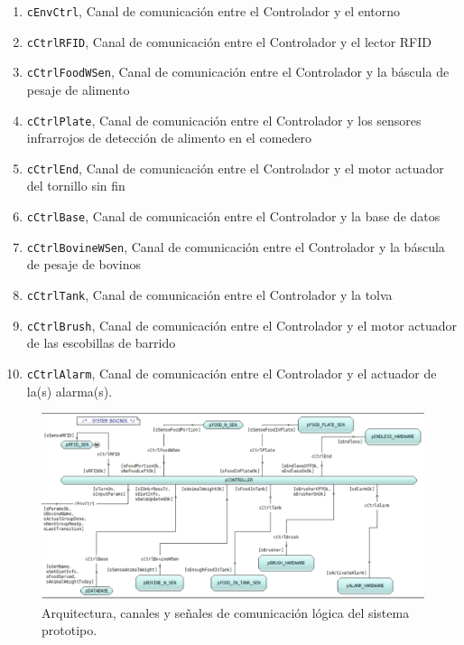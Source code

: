 \begin{enumerate}
    \item \texttt{cEnvCtrl}, Canal de comunicación entre el Controlador y el entorno
    \item \texttt{cCtrlRFID}, Canal de comunicación entre el Controlador y el lector RFID
    \item \texttt{cCtrlFoodWSen}, Canal de comunicación entre el Controlador y la báscula de pesaje de alimento
    \item \texttt{cCtrlPlate}, Canal de comunicación entre el Controlador y los sensores infrarrojos de detección de alimento en el comedero
    \item \texttt{cCtrlEnd}, Canal de comunicación entre el Controlador y el motor actuador del tornillo sin fin
    \item \texttt{cCtrlBase}, Canal de comunicación entre el Controlador y la base de datos
    \item \texttt{cCtrlBovineWSen}, Canal de comunicación entre el Controlador y la báscula de pesaje de bovinos
    \item \texttt{cCtrlTank}, Canal de comunicación entre el Controlador y la tolva
    \item \texttt{cCtrlBrush}, Canal de comunicación entre el Controlador y el motor actuador de las escobillas de barrido
    \item \texttt{cCtrlAlarm}, Canal de comunicación entre el Controlador y el actuador de la(s) alarma(s).
\end{enumerate}
\pagebreak


\begin{figure}
    \begin{center}
    	\includegraphics[scale=0.50,angle=90]{img/arqui.png}
    \end{center}
    \caption{Arquitectura, canales y señales de comunicación lógica del sistema prototipo.}
    \label{arquipng}
\end{figure}

